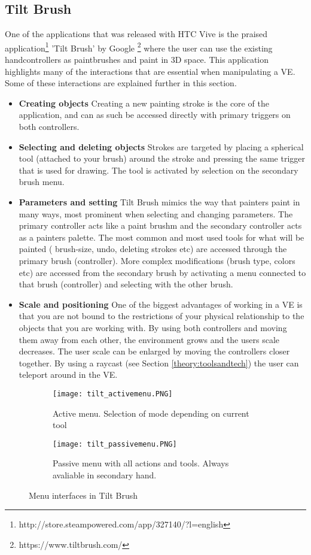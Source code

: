 \subsection{Tilt Brush}
\label{theory:best-practice:tiltbrush}
 One of the applications that was released with HTC Vive is the praised application\footnote{http://store.steampowered.com/app/327140/?l=english} 'Tilt Brush' by Google \footnote{https://www.tiltbrush.com/} where the user can use the existing handcontrollers as paintbrushes and paint in 3D space. This application highlights many of the interactions that are essential when manipulating a VE. Some of these interactions are explained further in this section.
 \begin{itemize}
\item \textbf{Creating objects}
Creating a new painting stroke is the core of the application, and can as such be accessed directly with primary triggers on both controllers.
\item \textbf{Selecting and deleting objects}
Strokes are targeted by placing a spherical tool (attached to your brush) around the stroke and pressing the same trigger that is used for drawing. The tool is activated by selection on the secondary brush menu.
\item \textbf{Parameters and setting}
Tilt Brush mimics the way that painters paint in many ways, most prominent when selecting and changing parameters. The primary controller acts like a paint brushm and the secondary controller acts as a painters palette. The most common and most used tools for what will be painted ( brush-size, undo, deleting strokes etc) are accessed through the primary brush (controller). More complex modifications (brush type, colors etc) are accessed from the secondary brush by activating a menu connected to that brush (controller) and selecting with the other brush.
\item \textbf{Scale and positioning}
One of the biggest advantages of working in a VE is that you are not bound to the restrictions of your physical relationship to the objects that you are working with. By using both controllers and moving them away from each other, the environment grows and the users scale decreases. The user scale can be enlarged by moving the controllers closer together.
By using a raycast (see Section \ref{theory:toolsandtech}) the user can teleport around in the VE.
 \end{itemize}
 \begin{figure}
 \begin{subfigure}{.5\textwidth}
   \centering
   \texttt{[image: tilt\_activemenu.PNG]}
   \caption{Active menu. Selection of mode depending on current tool}
   \label{fig:tilt:activemenu}
 \end{subfigure}%
 \begin{subfigure}{.5\textwidth}
   \centering
   \texttt{[image: tilt\_passivemenu.PNG]}
   \caption{Passive menu with all actions and tools. Always avaliable in secondary hand. }
   \label{fig:tilt:passivemenu}
 \end{subfigure}
 \caption{Menu interfaces in Tilt Brush}
 \label{fig:tilt}
 \end{figure}
